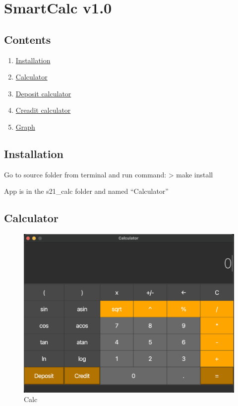 \documentclass[]{article}
\date{}
\providecommand{\tightlist}{%
  \setlength{\itemsep}{0pt}\setlength{\parskip}{0pt}}
\begin{document}
\section{SmartCalc v1.0}\label{smartcalc-v1.0}

\subsection{Contents}\label{contents}

\begin{enumerate}
\def\labelenumi{\arabic{enumi}.}
\setcounter{enumi}{-1}
\tightlist
\item
  \protect\hyperlink{installation}{Installation}
\item
  \protect\hyperlink{calc}{Calculator}
\item
  \protect\hyperlink{deposit}{Deposit calculator}
\item
  \protect\hyperlink{credit}{Creadit calculator}
\item
  \protect\hyperlink{graph}{Graph}
\end{enumerate}

\hypertarget{installation}{\subsection{Installation}\label{installation}}

Go to source folder from terminal and run command: \textgreater{} make
install

App is in the s21\_calc folder and named ``Calculator''

\subsection{Calculator}\label{calculator}

\begin{figure}[htbp]
\centering
\includegraphics{pics/calc.png}
\caption{Calc}
\end{figure}
\end{document}
